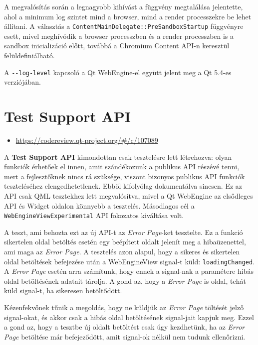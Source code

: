 \documentclass[12pt]{report}
\let\origurl\url
\renewcommand{\url}[1]{%
    \textcolor{blue}{\origurl{#1}}
}
\newcommand{\gerrit}[1]{%
    \textcolor{qtgreen}{\origurl{https://codereview.qt-project.org/\#/c/#1}}
}
\begin{document}
A megvalósítás során a legnagyobb kihívást a függvény megtalálása jelentette, ahol a minimum
log szintet mind a browser, mind a render processzekre be lehet állítani.
A választás a \texttt{ContentMainDelegate::PreSandboxStartup} függvényre esett, mivel
meghívódik a browser processzben és a render processzben is a sandbox inicializáció előtt,
továbbá a Chromium Content API-n keresztül felüldefiniálható.

A \texttt{-{}-log-level} kapcsoló a Qt WebEngine-el együtt jelent meg a Qt 5.4-es
verziójában.


\section{Test Support API}

\begin{center}
    \begin{reviewbox}
        \begin{itemize}
            \renewcommand{\labelitemi}{\textcolor{qtgreen}{$\blacktriangleright$}}
            \item \gerrit{107089}
        \end{itemize}
    \end{reviewbox}
\end{center}

\noindent
A \textbf{Test Support API} kimondottan csak tesztelésre lett létrehozva: olyan funkciók
érhetőek el innen, amit szándékozunk a publikus API részévé tenni, mert a fejlesztőknek
nincs rá szüksége, viszont bizonyos publikus API funkciók teszteléséhez elengedhetetlenek.
Ebből kifolyólag dokumentálva sincsen. Ez az API csak QML tesztekhez lett megvalósítva,
mivel a Qt WebEngine az elsődleges API és Widget oldalon könnyebb a tesztelés.
Másodlagos cél a \texttt{WebEngineViewExperimental} API fokozatos kiváltása volt.

A teszt, ami behozta ezt az új API-t az \textit{Error Page}-ket tesztelte.
Ez a funkció sikertelen oldal betöltés esetén egy beépített oldalt jelenít meg a
hibaüzenettel, ami maga az \textit{Error Page}. A tesztelés azon alapul, hogy a sikeres és
sikertelen oldal betöltések befejezése után a WebEngineView signal-t küld:
\texttt{loadingChanged}. A \textit{Error Page} esetén arra számítunk, hogy ennek a signal-nak
a paramétere hibás oldal betöltésének adatait tárolja. A gond az, hogy a \textit{Error Page}
is oldal, tehát küld signal-t, ha sikeresen betöltődött.

Kézenfekvőnek tűnik a megoldás, hogy ne küldjük az \textit{Error Page} töltését jelző
signal-okat, és akkor csak a hibás oldal betöltésének signal-jait kapjuk meg. Ezzel a gond
az, hogy a tesztbe új oldalt betöltést csak úgy kezdhetünk, ha az \textit{Error Page}
betöltése már befejeződött, amit signal-ok nélkül nem tudunk ellenőrizni.
\end{document}
